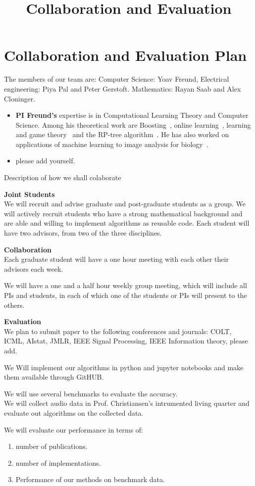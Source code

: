 \documentclass{article}
\title{Collaboration and Evaluation}
\begin{document}
\section{Collaboration and Evaluation Plan}
The members of our team are: Computer Science: Yoav Freund,
Electrical engineering: Piya Pal and Peter Gerstoft.
Mathematics: Rayan Saab and Alex Cloninger.

\begin{itemize}
\item {\bf PI Freund's} expertise is in Computational Learning Theory and
Computer Science. Among his theoretical work are 
Boosting~\cite{}, online learning~\cite{}, learning and game
theory~\cite{} and the RP-tree algorithm~\cite{}. He has also worked
on applications of machine learning to image analysis for
biology~\cite{}.
\item please add yourself.
\end{itemize}

Description of how we shall colaborate

{\bf Joint Students}\\
We will recruit and advise graduate and post-graduate students as a
group. We will actively recruit students who have a strong
mathematical background and are able and willing to implement
algorithms as reusable code.  Each student will have two advisors,
from two of the three disciplines.

{\bf Collaboration}\\
Each graduate student will have a one hour meeting with each other
their advisors each week.

We will have a one and a half hour weekly group meeting, which will
include all PIs and students, in each of which one of the students or
PIs will present to the others.

{\bf Evaluation}\\
We plan to submit paper to the following conferences and journals:
COLT, ICML, AIstat, JMLR, IEEE Signal Processing, IEEE Information
theory, please add.

We Will implement our algorithms in python and jupyter notebooks and
make them available through GitHUB.

We will use several benchmarks to evaluate the accuracy.
\\
We will collect audio data in Prof. Christiansen's intrumented living
quarter and evaluate out algorithms on the collected data.

We will evaluate our performance in terms of:
\begin{enumerate}
\item number of publications.
\item number of implementations.
\item Performance of our methods on benchmark data.
\end{enumerate}
\end{document}
